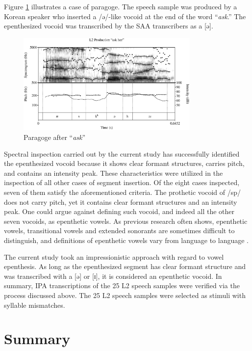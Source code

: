 Figure \ref{fig:epen} illustrates a case of paragoge. The speech sample was produced by a Korean speaker who inserted a /ə/-like vocoid at the end of the word “\textit{ask}.” The epenthesized vocoid was transcribed by the SAA transcribers as a [ə]. 

\begin{figure}[h!]
  \figSpace
    \centering
	\includegraphics[width=0.8\textwidth]{figures/chp3/insert.eps}
    \caption{Paragoge after “\textit{ask}”}
    \label{fig:epen}
  \figSpace
\end{figure}

Spectral inspection carried out by the current study has successfully identified the epenthesized vocoid because it shows clear formant structures, carries pitch, and contains an intensity peak. These characteristics were utilized in the inspection of all other cases of segment insertion. Of the eight cases inspected, seven of them satisfy the aforementioned criteria. The prothetic vocoid of /sp/ does not carry pitch, yet it contains clear formant structures and an intensity peak. One could argue against defining such vocoid, and indeed all the other seven vocoids, as epenthetic vowels. As previous research often shows, epenthetic vowels, transitional vowels and extended sonorants are sometimes difficult to distinguish, and definitions of epenthetic vowels vary from language to language \citep{Gouskova_2009, Hall_2011, Hall_2003}. 

The current study took an impressionistic approach with regard to vowel epenthesis. As long as the epenthesized segment has clear formant structure and was transcribed with a [ə] or [ɪ], it is considered an epenthetic vocoid.  In summary, IPA transcriptions of the 25 L2 speech samples were verified via the process discussed above. The 25 L2 speech samples were selected as stimuli with syllable mismatches. 

\section{Summary}

